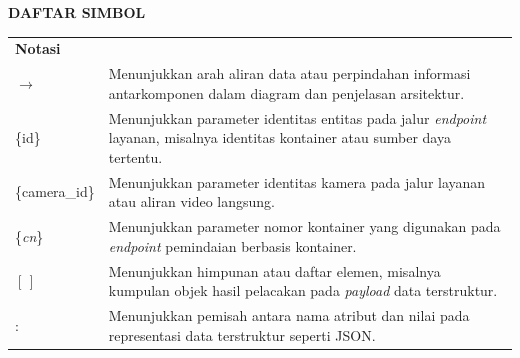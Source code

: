 \cleardoublepage
\vspace{2cm}
\begin{center}
{\fontsize{14}{16.8}\selectfont\textbf{DAFTAR SIMBOL}}\\[1em]
\end{center}
\label{chap:simbol}
\setcounter{chapter}{0}
\setcounter{section}{0}
\vspace{2em}

\begin{longtable}{@{} l >{\raggedright\arraybackslash}p{11cm} @{}}
\multicolumn{1}{l}{\textbf{Notasi}} & \multicolumn{1}{l}{\textbf{Deskripsi}} \\

$\to$ & Menunjukkan arah aliran data atau perpindahan informasi antarkomponen dalam diagram dan penjelasan arsitektur. \\
\{id\} & Menunjukkan parameter identitas entitas pada jalur \textit{endpoint} layanan, misalnya identitas kontainer atau sumber daya tertentu. \\
\{camera\_id\} & Menunjukkan parameter identitas kamera pada jalur layanan atau aliran video langsung. \\
\{\textit{cn}\} & Menunjukkan parameter nomor kontainer yang digunakan pada \textit{endpoint} pemindaian berbasis kontainer. \\
$[\,]$ & Menunjukkan himpunan atau daftar elemen, misalnya kumpulan objek hasil pelacakan pada \textit{payload} data terstruktur. \\
: & Menunjukkan pemisah antara nama atribut dan nilai pada representasi data terstruktur seperti JSON. \\

\end{longtable}
